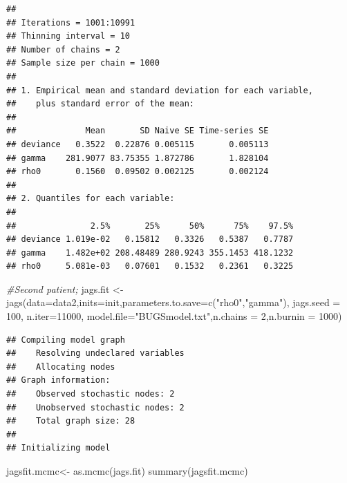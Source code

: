 \documentclass[
]{article}
\newenvironment{Shaded}{\begin{snugshade}}{\end{snugshade}}
\newcommand{\AttributeTok}[1]{\textcolor[rgb]{0.77,0.63,0.00}{#1}}
\newcommand{\CommentTok}[1]{\textcolor[rgb]{0.56,0.35,0.01}{\textit{#1}}}
\newcommand{\DecValTok}[1]{\textcolor[rgb]{0.00,0.00,0.81}{#1}}
\newcommand{\FunctionTok}[1]{\textcolor[rgb]{0.00,0.00,0.00}{#1}}
\newcommand{\NormalTok}[1]{#1}
\newcommand{\OtherTok}[1]{\textcolor[rgb]{0.56,0.35,0.01}{#1}}
\newcommand{\StringTok}[1]{\textcolor[rgb]{0.31,0.60,0.02}{#1}}
\begin{document}
\begin{verbatim}
## 
## Iterations = 1001:10991
## Thinning interval = 10 
## Number of chains = 2 
## Sample size per chain = 1000 
## 
## 1. Empirical mean and standard deviation for each variable,
##    plus standard error of the mean:
## 
##              Mean       SD Naive SE Time-series SE
## deviance   0.3522  0.22876 0.005115       0.005113
## gamma    281.9077 83.75355 1.872786       1.828104
## rho0       0.1560  0.09502 0.002125       0.002124
## 
## 2. Quantiles for each variable:
## 
##               2.5%       25%      50%      75%    97.5%
## deviance 1.019e-02   0.15812   0.3326   0.5387   0.7787
## gamma    1.482e+02 208.48489 280.9243 355.1453 418.1232
## rho0     5.081e-03   0.07601   0.1532   0.2361   0.3225
\end{verbatim}

\begin{Shaded}
\begin{Highlighting}[]
\CommentTok{\#Second patient;}
\NormalTok{jags.fit }\OtherTok{\textless{}{-}} \FunctionTok{jags}\NormalTok{(}\AttributeTok{data=}\NormalTok{data2,}\AttributeTok{inits=}\NormalTok{init,}\AttributeTok{parameters.to.save=}\FunctionTok{c}\NormalTok{(}\StringTok{"rho0"}\NormalTok{,}\StringTok{"gamma"}\NormalTok{),}
         \AttributeTok{jags.seed =} \DecValTok{100}\NormalTok{, }\AttributeTok{n.iter=}\DecValTok{11000}\NormalTok{, }\AttributeTok{model.file=}\StringTok{"BUGSmodel.txt"}\NormalTok{,}\AttributeTok{n.chains =} \DecValTok{2}\NormalTok{,}\AttributeTok{n.burnin =} \DecValTok{1000}\NormalTok{)}
\end{Highlighting}
\end{Shaded}

\begin{verbatim}
## Compiling model graph
##    Resolving undeclared variables
##    Allocating nodes
## Graph information:
##    Observed stochastic nodes: 2
##    Unobserved stochastic nodes: 2
##    Total graph size: 28
## 
## Initializing model
\end{verbatim}

\begin{Shaded}
\begin{Highlighting}[]
\NormalTok{jagsfit.mcmc}\OtherTok{\textless{}{-}} \FunctionTok{as.mcmc}\NormalTok{(jags.fit)}
\FunctionTok{summary}\NormalTok{(jagsfit.mcmc)}
\end{Highlighting}
\end{Shaded}
\end{document}
